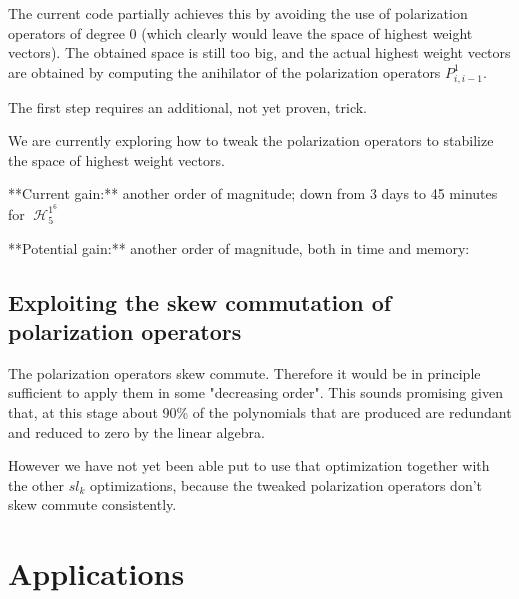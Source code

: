 \documentclass[letter,12pt]{article}
\DeclareMathOperator{\harmonics}{\mathcal{H}}
\begin{document}
	The current code partially achieves this by avoiding the use of polarization operators of degree $0$ (which clearly would leave the space of highest weight vectors). The obtained space is still too big, and the actual highest weight vectors are obtained by computing the anihilator of the polarization operators $P_{i,i-1}^1$.
	
	The first step requires an additional, not yet proven, trick.
	
	We are currently exploring how to tweak the polarization operators to stabilize the space of highest weight vectors.
	
	**Current gain:** another order of magnitude; down from 3 days to 45 minutes for $\harmonics_5^{1^6}$
	
	**Potential gain:** another order of magnitude, both in time and memory:
	
	\subsection{Exploiting the skew commutation of polarization operators}
	
	The polarization operators skew commute. Therefore it would be in principle sufficient to apply them in some "decreasing order". This sounds promising given that, at this stage about 90\% of the polynomials that are produced are redundant and reduced to zero by the linear algebra.
	
	However we have not yet been able put to use that optimization together with the other $sl_k$ optimizations, because the tweaked polarization operators don't skew commute consistently.
	
	\section{Applications}
	

\nocite{*}

\end{document}
